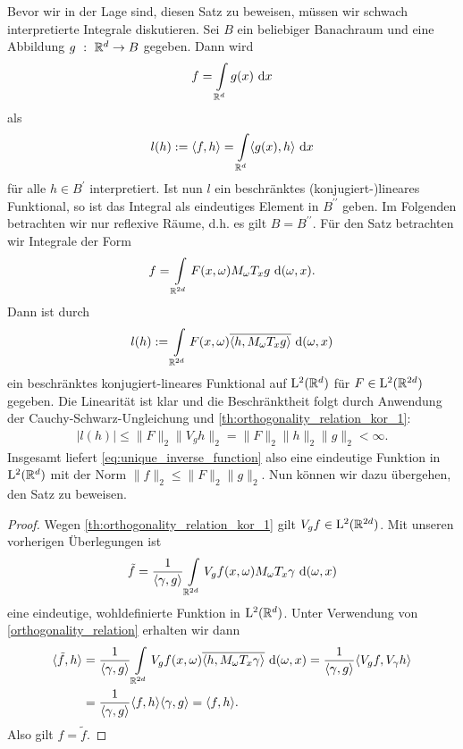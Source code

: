 Bevor wir in der Lage sind, diesen Satz zu beweisen, müssen wir schwach interpretierte Integrale diskutieren. Sei $ B $ ein beliebiger Banachraum und eine Abbildung $ g \ : \ \mathbb{R}^d \to B $ gegeben.
Dann wird 
\begin{align*}
f  = \int \limits_{\mathbb{R}^d} g(x) \text{ d} x
\end{align*}
als
\begin{align*}
l(h) := \langle f,h \rangle 
= 
\int \limits_{\mathbb{R}^d} \langle g(x) , h \rangle \text{ d} x
\end{align*}
für  alle $ h \in B^\prime $ interpretiert. Ist nun $ l $ ein beschränktes (konjugiert-)lineares Funktional, so ist das Integral als eindeutiges Element in $ B^{\prime \prime} $ geben.
Im Folgenden betrachten wir nur reflexive Räume, d.h. es gilt $ B = B^{\prime \prime} $. Für den Satz betrachten wir Integrale der Form 
\begin{align}\label{eq:unique_inverse_function}
f = \int \limits_{\mathbb{R}^{2d}} F(x,\omega) M_\omega T_x g \text{ d} (\omega,x).
\end{align}
Dann ist durch
\begin{align*}
l(h) := \int \limits_{\mathbb{R}^{2d}} F(x,\omega) \overline{\langle h , M_\omega T_x g \rangle} \text{ d} (\omega,x)
\end{align*}
ein beschränktes konjugiert-lineares Funktional auf $ \mathrm{L}^2(\mathbb{R}^d) $ für $ F \in \mathrm{L}^2(\mathbb{R}^{2d}) $ gegeben.
Die Linearität ist klar und die Beschränktheit folgt durch Anwendung der Cauchy-Schwarz-Ungleichung und \ref{th:orthogonality_relation_kor_1}:
\begin{align}\label{eq:unique_inverse_bounded}
| l(h) |
\leq 
\| F \|_2 \| V_g h \|_2 = \| F \|_2 \| h \|_2 \| g \|_2 < \infty. 
\end{align}
Insgesamt liefert \eqref{eq:unique_inverse_function} also eine eindeutige Funktion in $ \mathrm{L}^2(\mathbb{R}^d) $ mit der Norm $ \| f \|_2 \leq \| F\|_2 \| g \|_2 $.
Nun können wir dazu übergehen, den Satz zu beweisen.

\begin{proof}
	Wegen \ref{th:orthogonality_relation_kor_1} gilt $ V_g f \in \mathrm{L}^2(\mathbb{R}^{2d}) $.
	Mit unseren vorherigen Überlegungen ist 
	\begin{align*}
	\tilde{f} = \frac{1}{\langle \gamma , g \rangle}\int \limits_{\mathbb{R}^{2d}} V_g f(x,\omega) M_\omega T_x \gamma \text{ d} (\omega,x)
	\end{align*}
	eine eindeutige, wohldefinierte Funktion in $ \mathrm{L}^2(\mathbb{R}^d) $. Unter Verwendung von \eqref{orthogonality_relation} erhalten wir dann
	\begin{align*}
	\langle \tilde{f}, h \rangle 
	&= 
	\frac{1}{\langle \gamma, g \rangle}
	\int \limits_{\mathbb{R}^{2d}} V_g f(x,\omega) \overline{\langle h , M_\omega T_x \gamma \rangle} \text{ d} (\omega,x)
	=
	\frac{1}{\langle \gamma, g \rangle}
	\langle V_g f , V_\gamma h \rangle\\
	&=
	\frac{1}{\langle \gamma, g \rangle} 
	\langle f, h \rangle  \langle \gamma , g \rangle = \langle f, h \rangle.
	\end{align*}
	Also gilt $ f = \tilde{ f} $.
\end{proof}

